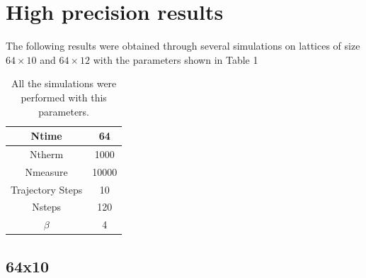 \documentclass[11pt]{article}
\begin{document}
\title{}
\date{\today}
\author{Jaime Fabián Nieto Castellanos}
\maketitle

\section*{High precision results}

The following results were obtained through several simulations on lattices of size $64\times 10$ and $64\times 12$ with the parameters shown in Table 1

\begin{table}[H]
\centering
\begin{tabular}{|c|c|}
\hline
Ntime            & 64   \\ \hline
Ntherm           & 1000  \\ \hline
Nmeasure         & 10000 \\ \hline
Trajectory Steps & 10   \\ \hline
Nsteps           & 120   \\ \hline
$\beta$          & 4   \\ \hline
\end{tabular}
\caption{All the simulations were performed with this parameters.}
\end{table}

\pagebreak

\subsection*{64x10}
\end{document}
